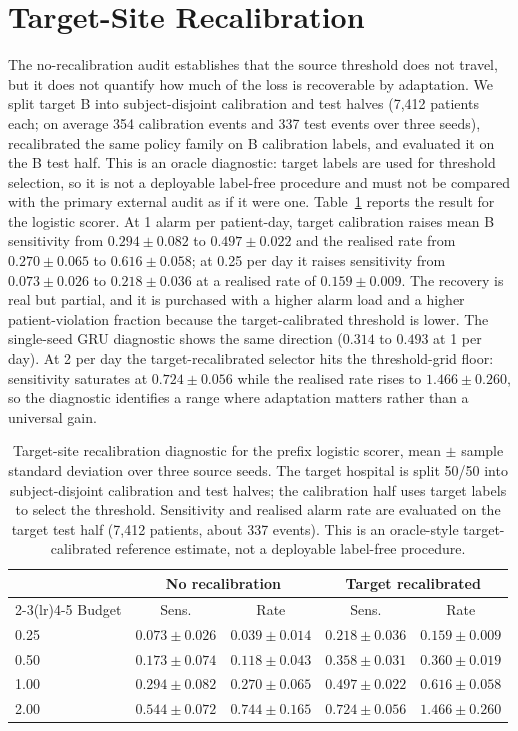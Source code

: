 \section{Target-Site Recalibration}
\label{sec:supp-target}

The no-recalibration audit establishes that the source threshold does not travel, but it does not quantify how much of the loss is recoverable by adaptation. We split target B into subject-disjoint calibration and test halves (7,412 patients each; on average 354 calibration events and 337 test events over three seeds), recalibrated the same policy family on B calibration labels, and evaluated it on the B test half. This is an oracle diagnostic: target labels are used for threshold selection, so it is not a deployable label-free procedure and must not be compared with the primary external audit as if it were one. Table~\ref{tab:target} reports the result for the logistic scorer. At 1 alarm per patient-day, target calibration raises mean B sensitivity from $0.294\pm0.082$ to $0.497\pm0.022$ and the realised rate from $0.270\pm0.065$ to $0.616\pm0.058$; at 0.25 per day it raises sensitivity from $0.073\pm0.026$ to $0.218\pm0.036$ at a realised rate of $0.159\pm0.009$. The recovery is real but partial, and it is purchased with a higher alarm load and a higher patient-violation fraction because the target-calibrated threshold is lower. The single-seed GRU diagnostic shows the same direction ($0.314$ to $0.493$ at 1 per day). At 2 per day the target-recalibrated selector hits the threshold-grid floor: sensitivity saturates at $0.724\pm0.056$ while the realised rate rises to $1.466\pm0.260$, so the diagnostic identifies a range where adaptation matters rather than a universal gain.

\begin{table}[H]
\centering
\caption{Target-site recalibration diagnostic for the prefix logistic scorer, mean $\pm$ sample standard deviation over three source seeds. The target hospital is split 50/50 into subject-disjoint calibration and test halves; the calibration half uses target labels to select the threshold. Sensitivity and realised alarm rate are evaluated on the target test half (7,412 patients, about 337 events). This is an oracle-style target-calibrated reference estimate, not a deployable label-free procedure.}
\label{tab:target}
\small
\begin{tabular}{lcccc}
\toprule
 & \multicolumn{2}{c}{No recalibration} & \multicolumn{2}{c}{Target recalibrated} \\
\cmidrule(lr){2-3}\cmidrule(lr){4-5}
Budget & Sens. & Rate & Sens. & Rate \\
\midrule
0.25 & $0.073\pm0.026$ & $0.039\pm0.014$ & $0.218\pm0.036$ & $0.159\pm0.009$ \\
0.50 & $0.173\pm0.074$ & $0.118\pm0.043$ & $0.358\pm0.031$ & $0.360\pm0.019$ \\
1.00 & $0.294\pm0.082$ & $0.270\pm0.065$ & $0.497\pm0.022$ & $0.616\pm0.058$ \\
2.00 & $0.544\pm0.072$ & $0.744\pm0.165$ & $0.724\pm0.056$ & $1.466\pm0.260$ \\
\bottomrule
\end{tabular}
\end{table}
